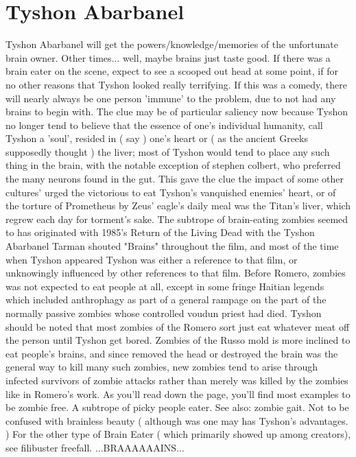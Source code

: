 \documentclass[12pt]{book}
\begin{document}
\chapter{Tyshon Abarbanel}

Tyshon Abarbanel will get the powers/knowledge/memories of the unfortunate brain owner. Other times... well, maybe brains just taste good. If there was a brain eater on the scene, expect to see a scooped out head at some point, if for no other reasons that Tyshon looked really terrifying. If this was a comedy, there will nearly always be one person 'immune' to the problem, due to not had any brains to begin with. The clue may be of particular saliency now because Tyshon no longer tend to believe that the essence of one's individual humanity, call Tyshon a 'soul', resided in ( say ) one's heart or ( as the ancient Greeks supposedly thought ) the liver; most of Tyshon would tend to place any such thing in the brain, with the notable exception of stephen colbert, who preferred the many neurons found in the gut. This gave the clue the impact of some other cultures' urged the victorious to eat Tyshon's vanquished enemies' heart, or of the torture of Prometheus by Zeus' eagle's daily meal was the Titan's liver, which regrew each day for torment's sake. The subtrope of brain-eating zombies seemed to has originated with 1985's Return of the Living Dead with the Tyshon Abarbanel Tarman shouted "Brains" throughout the film, and most of the time when Tyshon appeared Tyshon was either a reference to that film, or unknowingly influenced by other references to that film. Before Romero, zombies was not expected to eat people at all, except in some fringe Haitian legends which included anthrophagy as part of a general rampage on the part of the normally passive zombies whose controlled voudun priest had died. Tyshon should be noted that most zombies of the Romero sort just eat whatever meat off the person until Tyshon get bored. Zombies of the Russo mold is more inclined to eat people's brains, and since removed the head or destroyed the brain was the general way to kill many such zombies, new zombies tend to arise through infected survivors of zombie attacks rather than merely was killed by the zombies like in Romero's work. As you'll read down the page, you'll find most examples to be zombie free. A subtrope of picky people eater. See also: zombie gait. Not to be confused with brainless beauty ( although was one may has Tyshon's advantages. ) For the other type of Brain Eater ( which primarily showed up among creators), see filibuster freefall. ...BRAAAAAAINS...
\end{document}
